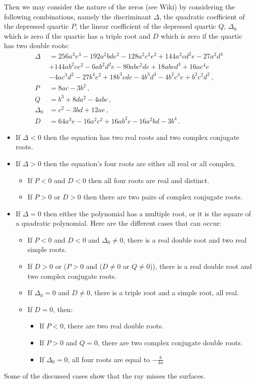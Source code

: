 \documentclass[12pt,a4paper,twoside,openright,BCOR10mm,headsepline,titlepage,abstracton,chapterprefix,final]{scrreprt}
\begin{document}
Then we may consider the nature of the zeros (see Wiki) by considering the following combinations, namely
the discriminant $\Delta$, the quadratic coefficient of the depressed quartic $P$, the linear coefficient of
the depressed quartic $Q$, $\Delta_0$ which is zero if the quartic has a triple root and $D$ which is zero
if the quartic has two double roots:
\begin{subequations}
 \begin{align}
  \Delta &= 256 a^3 e^3 - 192 a^2 b d e^2 - 128 a^2 c^2 e^2 + 144 a^2 c d^2 e - 27 a^2 d^4 \nonumber\\ 
&+ 144 a b^2 c e^2 - 6 a b^2 d^2 e - 80 a b c^2 d e + 18 a b c d^3 + 16 a c^4 e \nonumber\\
&- 4 a c^3 d^2 - 27 b^4 e^2 + 18 b^3 c d e - 4 b^3 d^3 - 4 b^2 c^3 e + b^2 c^2 d^2\,,\\
   P &= 8ac - 3b^2\,,\\
   Q &= b^3+8da^2-4abc\,,\\
   \Delta_0 &= c^2 - 3bd + 12ae\,,\\
   D &= 64 a^3 e - 16 a^2 c^2 + 16 a b^2 c - 16 a^2 bd - 3 b^4\,.
 \end{align}
\end{subequations}

\begin{itemize}
\item If $\Delta < 0$  then the equation has two real roots and two complex conjugate roots.
\item If $\Delta > 0$  then the equation's four roots are either all real or all complex.
\begin{itemize}
\item If $P < 0$ and $D < 0$ then all four roots are real and distinct.
\item If $P > 0$ or $D > 0$ then there are two pairs of complex conjugate roots.
\end{itemize}
\item If $\Delta = 0$  then either the polynomial has a multiple root, 
  or it is the square of a quadratic polynomial. Here are the different cases that can occur:
  \begin{itemize}
\item If $P < 0$ and $D < 0$ and $\Delta_0\ne0$, there is a real double root and two real simple roots.
\item If $D > 0$ or ($P > 0$ and ($D \ne 0$ or $Q \ne 0$)), there is a real double root and two complex conjugate roots.
\item If $\Delta_0 = 0$ and $D \ne 0$, there is a triple root and a simple root, all real.
\item If $D = 0$, then:
  \begin{itemize}
\item If $P < 0$, there are two real double roots.
\item If $P > 0$ and $Q = 0$, there are two complex conjugate double roots.
\item If $ \Delta_0  = 0$, all four roots are equal to $-\frac{b}{4a}$
  \end{itemize}
  \end{itemize}
\end{itemize}
Some of the discussed cases show that the ray misses the surfaces.
\end{document}
